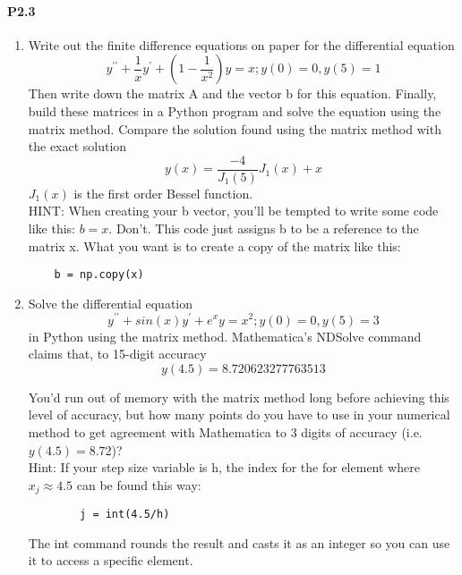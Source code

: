 \paragraph*{P2.3}
	\begin{enumerate}[label=(\alph*)]
		\item Write out the finite difference equations on paper for the differential equation
		\begin{equation} \label{eq:26}
				y^{\prime\prime} + \frac{1}{x}y^\prime + (1 - \frac{1}{x^2})y=x ; y(0) = 0 , y(5) = 1
		\end{equation}
		Then write down the matrix A and the vector b for this equation. Finally, build these matrices in a Python program and solve the equation using the matrix method. Compare the solution found using the matrix method with the exact solution
		\begin{equation*}
			y(x) = \frac{-4}{J_1(5)}J_1(x)+x
		\end{equation*}
		$J_1(x)$ is the first order Bessel function.\\ HINT: When creating your b vector, you\rq ll be tempted to write some code like this: $b=x$. Don\rq t. This code just assigns b to be a reference to the matrix x. What you want is to create a copy of the matrix like this: \\ 
		\begin{lstlisting}	
	b = np.copy(x)
	\end{lstlisting}
	\item 	Solve the differential equation
	\begin{equation}\label{eq:27}
	y^{\prime\prime} + sin(x)y^\prime+e^xy=x^2 ; y(0) = 0, y(5)=3
\end{equation}		
	in Python using the matrix method. Mathematica\rq s NDSolve command claims that, to 15-digit accuracy
		\begin{equation*}
			y(4.5) = 8.720623277763513
		\end{equation*}

	You\rq d run out of memory with the matrix method long before achieving this level of accuracy, but how many points do you have to use in your numerical method to get agreement with Mathematica to 3 digits of accuracy (i.e. $y(4.5) = 8.72$)?		
		\\
		Hint: If your step size variable is h, the index for the for element where
$x_j \approx 4.5$ can be found this way:
	\begin{lstlisting}
		j = int(4.5/h)
	\end{lstlisting}
	The int command rounds the result and casts it as an integer so you can use it to access a specific element.
	\end{enumerate}
	
